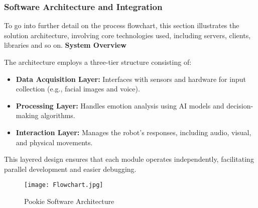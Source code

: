 \subsubsection{Software Architecture and Integration}
To go into further detail on the process flowchart, this section illustrates the solution architecture, involving core technologies used, including servers, clients, libraries and so on.
\textbf{System Overview}

The architecture employs a three-tier structure consisting of:
\begin{itemize}
\item\textbf{Data Acquisition Layer:} Interfaces with sensors and hardware for input collection (e.g., facial images and voice).

\item\textbf{Processing Layer:} Handles emotion analysis using AI models and decision-making algorithms.

\item\textbf{Interaction Layer:} Manages the robot's responses, including audio, visual, and physical movements.
\end{itemize}

This layered design ensures that each module operates independently, facilitating parallel development and easier debugging.

\begin{figure}[ht]
    \centering
    \captionsetup{justification=centering}
    \texttt{[image: Flowchart.jpg]}
    \caption{Pookie Software Architecture}
    \label{fig:architecture}
\end{figure}

